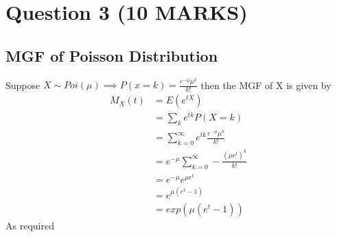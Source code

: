 \documentclass[11pt]{article}
\begin{document}
\section{Question 3 (10 MARKS)}
\subsection{MGF of Poisson Distribution}
Suppose $X \sim Poi(\mu) \implies P(x=k) = \frac{e^{-\mu}\mu^{k}}{k!}$ then the MGF of X is given by
\begin{align*}
  M_{X}(t)&= E(e^{tX}) \\
          &= \sum_{k} e^{tk}P(X=k) \\
          &= \sum_{k=0}^{\infty} e^{tk}\frac{e^{-\mu}\mu^{k}}{k!} \\
          &= e^{-\mu} \sum_{k=0}^{\infty} -\frac{(\mu e^{t})^{k}}{k!}\\
          &= e^{-\mu} e^{\mu e^{t}}\\
          &= e^{\mu(e^{t} -1)} \\
          &= exp(\mu(e^{t}-1))
\end{align*}
As required 
\end{document}
